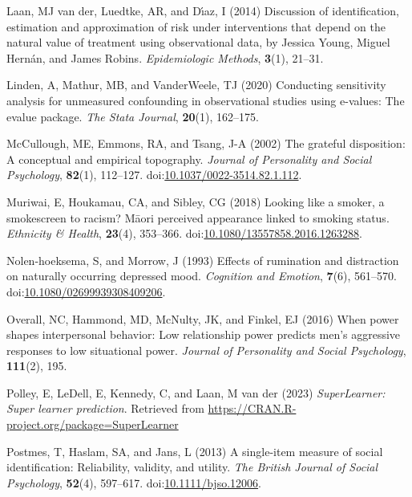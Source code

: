 \documentclass[
  single column]{article}
\newlength{\cslhangindent}
\newenvironment{CSLReferences}[2] %
 {\begin{list}{}{%
  \setlength{\itemindent}{0pt}
  \setlength{\leftmargin}{0pt}
  \setlength{\parsep}{0pt}
  \ifodd #1
   \setlength{\leftmargin}{\cslhangindent}
   \setlength{\itemindent}{-1\cslhangindent}
  \fi
  \setlength{\itemsep}{#2\baselineskip}}}
 {\end{list}}
\begin{document}
\begin{CSLReferences}{1}{0}
Laan, MJ van der, Luedtke, AR, and Dı́az, I (2014) Discussion of
identification, estimation and approximation of risk under interventions
that depend on the natural value of treatment using observational data,
by {J}essica {Y}oung, {M}iguel {H}ern{á}n, and {J}ames {R}obins.
\emph{Epidemiologic Methods}, \textbf{3}(1), 21--31.

Linden, A, Mathur, MB, and VanderWeele, TJ (2020) Conducting sensitivity
analysis for unmeasured confounding in observational studies using
e-values: The evalue package. \emph{The Stata Journal}, \textbf{20}(1),
162--175.

McCullough, ME, Emmons, RA, and Tsang, J-A (2002) The grateful
disposition: A conceptual and empirical topography. \emph{Journal of
Personality and Social Psychology}, \textbf{82}(1), 112--127.
doi:\href{https://doi.org/10.1037/0022-3514.82.1.112}{10.1037/0022-3514.82.1.112}.

Muriwai, E, Houkamau, CA, and Sibley, CG (2018) Looking like a smoker, a
smokescreen to racism? Māori perceived appearance linked to smoking
status. \emph{Ethnicity \& Health}, \textbf{23}(4), 353--366.
doi:\href{https://doi.org/10.1080/13557858.2016.1263288}{10.1080/13557858.2016.1263288}.

Nolen-hoeksema, S, and Morrow, J (1993) Effects of rumination and
distraction on naturally occurring depressed mood. \emph{Cognition and
Emotion}, \textbf{7}(6), 561--570.
doi:\href{https://doi.org/10.1080/02699939308409206}{10.1080/02699939308409206}.

Overall, NC, Hammond, MD, McNulty, JK, and Finkel, EJ (2016) When power
shapes interpersonal behavior: Low relationship power predicts men's
aggressive responses to low situational power. \emph{Journal of
Personality and Social Psychology}, \textbf{111}(2), 195.

Polley, E, LeDell, E, Kennedy, C, and Laan, M van der (2023)
\emph{SuperLearner: Super learner prediction}. Retrieved from
\url{https://CRAN.R-project.org/package=SuperLearner}

Postmes, T, Haslam, SA, and Jans, L (2013) A single-item measure of
social identification: Reliability, validity, and utility. \emph{The
British Journal of Social Psychology}, \textbf{52}(4), 597--617.
doi:\href{https://doi.org/10.1111/bjso.12006}{10.1111/bjso.12006}.


\end{CSLReferences}
\end{document}
